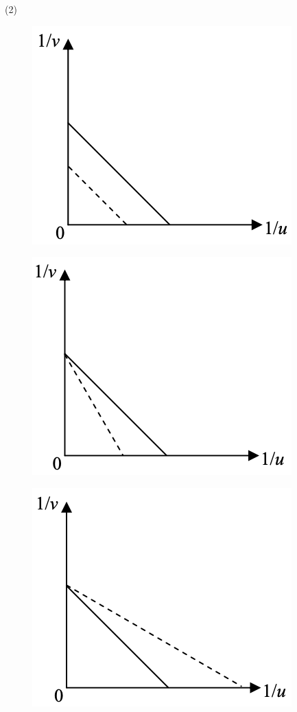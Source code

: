\documentclass[beamer=true]{standalone}
\begin{document}
\begin{eg}
    \begin{tasks}[item-indent=2em,label-offset=0em,before-skip=.3em,after-item-skip=.5em](2)
        \task
        \begin{figure}
            \centering
            \includegraphics[width=0.7\linewidth]{assets/dun982393.png}
        \end{figure}
        \task
        \begin{figure}
            \centering
            \includegraphics[width=0.7\linewidth]{assets/ddewcwcwcwcww.png}
        \end{figure}
        \task
        \begin{figure}
            \centering
            \includegraphics[width=0.7\linewidth]{assets/ewwewefwfqweqf.png}

\end{figure}
\end{tasks}
\end{eg}
\end{document}
